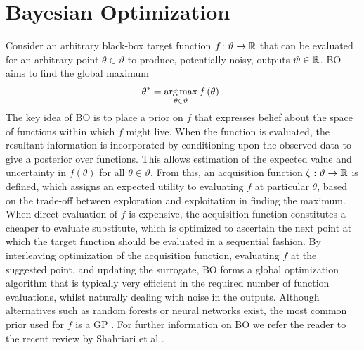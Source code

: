 
\section{Bayesian Optimization}
\label{sec:opt:BO}
Consider an arbitrary black-box target function $f \colon \vartheta \rightarrow \mathbb{R}$ that can be evaluated for an arbitrary point $\theta \in \vartheta$ to produce, potentially noisy, outputs $\hat{w} \in \mathbb{R}$.  BO \citep{jones1998efficient,osborne2009gaussian} aims to find the global maximum
\begin{align}
\label{eq:bo-funcMax}
\theta^* = \operatorname*{arg\,max}_{\theta \in \vartheta} f\left(\theta\right).
\end{align}
The key idea of BO is to place a prior on $f$ that expresses belief about the space of functions within which $f$ might live.  When the function is evaluated, the resultant information is incorporated by conditioning upon the observed data to give a posterior over functions.  
This allows estimation of the expected value and uncertainty in $f\left(\theta\right)$ for all $\theta \in \vartheta$.  
From this, an acquisition function $\zeta : \vartheta \rightarrow \mathbb{R}$ is defined, which assigns an expected utility to evaluating $f$ at particular $\theta$, based on the trade-off between exploration and exploitation in finding the maximum.  When direct evaluation of $f$ is expensive, the acquisition function constitutes a cheaper to evaluate substitute, which is optimized to ascertain the next point at which the target function should be evaluated in a sequential fashion.  By interleaving optimization of the acquisition function, evaluating $f$ at the suggested point, and updating the surrogate, BO forms a global optimization algorithm that is typically very efficient in the required number of function evaluations, whilst naturally dealing with noise in the outputs.  Although alternatives such as random forests \citep{bergstra2011algorithms,hutter2011sequential} or neural networks \citep{snoek2015scalable} exist, the most common prior used for $f$ is a GP \citep{rasmussen2006gaussian}.  
For further information on BO we refer the reader to the recent review by Shahriari et al \cite{shahriari2016taking}.
